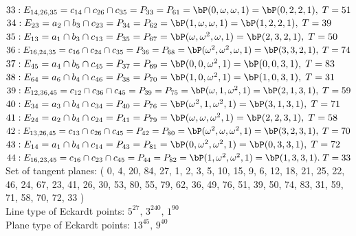$33 : E_{14,26,35}=c_{14} \cap c_{26} \cap c_{35} = P_{33} = P_{61}=\bP(0, \omega , \omega , 1) = \bP(0, 2, 2, 1),\; T= 51$\\
$34 : E_{23}=a_{2} \cap b_{3} \cap c_{23} = P_{34} = P_{62}=\bP(1, \omega , \omega , 1) = \bP(1, 2, 2, 1),\; T= 39$\\
$35 : E_{13}=a_{1} \cap b_{3} \cap c_{13} = P_{35} = P_{67}=\bP(\omega , \omega^{2}, \omega , 1) = \bP(2, 3, 2, 1),\; T= 50$\\
$36 : E_{16,24,35}=c_{16} \cap c_{24} \cap c_{35} = P_{36} = P_{68}=\bP(\omega^{2}, \omega^{2}, \omega , 1) = \bP(3, 3, 2, 1),\; T= 74$\\
$37 : E_{45}=a_{4} \cap b_{5} \cap c_{45} = P_{37} = P_{69}=\bP(0, 0, \omega^{2}, 1) = \bP(0, 0, 3, 1),\; T= 83$\\
$38 : E_{64}=a_{6} \cap b_{4} \cap c_{46} = P_{38} = P_{70}=\bP(1, 0, \omega^{2}, 1) = \bP(1, 0, 3, 1),\; T= 31$\\
$39 : E_{12,36,45}=c_{12} \cap c_{36} \cap c_{45} = P_{39} = P_{75}=\bP(\omega , 1, \omega^{2}, 1) = \bP(2, 1, 3, 1),\; T= 59$\\
$40 : E_{34}=a_{3} \cap b_{4} \cap c_{34} = P_{40} = P_{76}=\bP(\omega^{2}, 1, \omega^{2}, 1) = \bP(3, 1, 3, 1),\; T= 71$\\
$41 : E_{24}=a_{2} \cap b_{4} \cap c_{24} = P_{41} = P_{79}=\bP(\omega , \omega , \omega^{2}, 1) = \bP(2, 2, 3, 1),\; T= 58$\\
$42 : E_{13,26,45}=c_{13} \cap c_{26} \cap c_{45} = P_{42} = P_{80}=\bP(\omega^{2}, \omega , \omega^{2}, 1) = \bP(3, 2, 3, 1),\; T= 70$\\
$43 : E_{14}=a_{1} \cap b_{4} \cap c_{14} = P_{43} = P_{81}=\bP(0, \omega^{2}, \omega^{2}, 1) = \bP(0, 3, 3, 1),\; T= 72$\\
$44 : E_{16,23,45}=c_{16} \cap c_{23} \cap c_{45} = P_{44} = P_{82}=\bP(1, \omega^{2}, \omega^{2}, 1) = \bP(1, 3, 3, 1).\; T= 33$\\
Set of tangent planes: ( 0, 4, 20, 84, 27, 1, 2, 3, 5, 10, 15, 9, 6, 12, 18, 21, 25, 22, 46, 24, 67, 23, 41, 26, 30, 53, 80, 55, 79, 62, 36, 49, 76, 51, 39, 50, 74, 83, 31, 59, 71, 58, 70, 72, 33 )\\
Line type of Eckardt points: $5^{27},\,3^{240},\,1^{90}$\\
Plane type of Eckardt points: $13^{45},\, 9^{40} $\\

